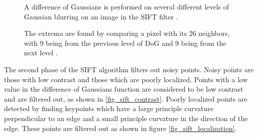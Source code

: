 \documentclass[oneside,11pt]{Latex/Classes/PhDthesisPSnPDF}
\begin{document}
\begin{figure}[h!]
  \caption{\label{fig_difference_of_gaussian} A difference of Gaussians is performed on several different levels of Gaussian blurring on an image in the SIFT filter \cite{marano_09}.}
\end{figure}

\begin{figure}[h!]
  \caption{\label{fig_nearest_neighbors} The extrema are found by comparing a pixel with its 26 neighbors, with 9 being from the previous level of DoG and 9 being from the next level \cite{marano_09}.}
\end{figure}

The second phase of the SIFT algorithm filters out noisy points.  Noisy points are those with low contrast and those which are poorly localized.  Points with a low value in the difference of Gaussians function are considered to be low contrast and are filtered out, as shown in \ref{fig_sift_contrast}. 
Poorly localized points are detected by finding keypoints which have a large principle curvature perpendicular to an edge and a small principle curvature in the direction of the edge.  These points are filtered out as shown in figure \ref{fig_sift_localization}.
\end{document}
